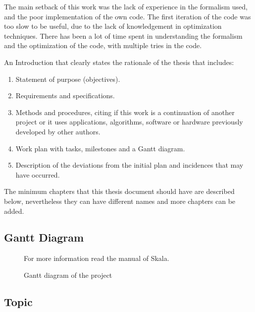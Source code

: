 The main setback of this work was the lack of experience in the formalism used, and the poor implementation of the own code. The first iteration of the code was too slow to be useful, due to the lack of knowledgement in optimization techniques. There has been a lot of time spent in understanding the formalism and the optimization of the code, with multiple tries in the code. 

{An Introduction that clearly states the rationale of the thesis that includes:}

\begin{enumerate}
\item {Statement of purpose (objectives).}
\item {Requirements and specifications.}
\item {Methods and procedures, citing if this work is a continuation of another project or it uses applications, algorithms,
software or hardware previously developed by other authors.}
\item {Work plan with tasks, milestones and a Gantt diagram.}
\item {Description of the deviations from the initial plan and incidences that may have occurred. }
\end{enumerate}

\bigskip

{The minimum chapters that this thesis document should have are described below, nevertheless they can have different
names and more chapters can be added.}

\bigskip

\subsection{Gantt Diagram}
\label{ssec:gantt}
\begin{figure}[H]
    \centering
    
    \caption[Project's Gantt diagram]{\footnotesize{Gantt diagram of the project}}
    \label{fig:gantt}
    For more information read the manual \cite{skalagantt} of Skala.
\end{figure}

\bigskip

\subsection{Topic}
